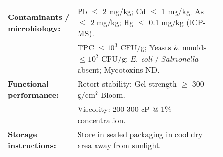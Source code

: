 \begin{adjustbox}{max width=\textwidth}
\begin{tabular}{@{}p{0.28\linewidth}p{0.60\linewidth}@{}}
\midrule

\textbf{Contaminants / microbiology: } &

Pb $\leq$ 2 mg/kg; Cd $\leq$ 1 mg/kg; As $\leq$ 2 mg/kg; Hg $\leq$ 0.1 mg/kg (ICP-MS). \\

& TPC $\leq 10^3$ CFU/g; Yeasts \& moulds $\leq 10^2$ CFU/g; \textit{E. coli} / \textit{Salmonella} absent; Mycotoxins ND. \\

\midrule

\textbf{Functional performance: } &

Retort stability: Gel strength $\geq$ 300 g/cm$^2$ Bloom. \\

& Viscosity: 200-300 cP @ 1\% concentration. \\

\midrule

\textbf{Storage instructions: } &

Store in sealed packaging in cool dry area away from sunlight. \\

\bottomrule

\end{tabular}

\end{adjustbox}



